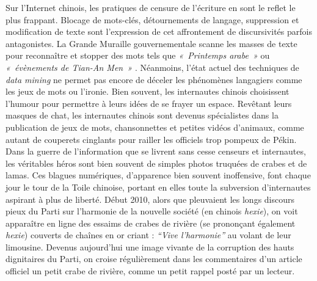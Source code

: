 Sur l’Internet chinois, les pratiques de censure de l’écriture en sont le reflet le plus frappant. Blocage de mots-clés, détournements de langage, suppression et modification de texte sont l’expression de cet affrontement de discursivités parfois antagonistes. La Grande Muraille gouvernementale scanne les masses de texte pour reconnaître et stopper des mots tels que \textit{« Printemps arabe »} ou \textit{« évènements de Tian-An Men »} \citep{McKinnon2009}. Néanmoins, l’état actuel des techniques de \textit{data mining} ne permet pas encore de déceler les phénomènes langagiers comme les jeux de mots ou l’ironie. Bien souvent, les internautes chinois choisissent l’humour pour permettre à leurs idées de se frayer un espace. Revêtant leurs masques de chat, les internautes chinois sont devenus spécialistes dans la publication de jeux de mots, chansonnettes et petites vidéos d’animaux, comme autant de couperets cinglants pour railler les officiels trop pompeux de Pékin. Dans la guerre de l’information que se livrent sans cesse censeurs et internautes, les véritables héros sont bien souvent de simples photos truquées de crabes et de lamas. Ces blagues numériques, d’apparence bien souvent inoffensive, font chaque jour le tour de la Toile chinoise, portant en elles toute la subversion d’internautes aspirant à plus de liberté. Début 2010, alors que pleuvaient les longs discours pieux du Parti sur l’harmonie de la nouvelle société (en chinois \textit{hexie}), on voit apparaître en ligne des essaims de crabes de rivière (se prononçant également \textit{hexie}) couverts de chaînes en or criant : \textit{“Vive l’harmonie”} au volant de leur limousine. Devenus aujourd’hui une image vivante de la corruption des hauts dignitaires du Parti, on croise régulièrement dans les commentaires d’un article officiel un petit crabe de rivière, comme un petit rappel posté par un lecteur.


